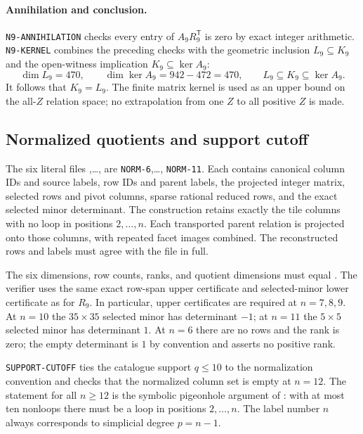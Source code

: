 \documentclass[11pt]{article}
\newcommand{\1}{\mathbf 1}
\begin{document}
\paragraph{Annihilation and conclusion.}
\texttt{N9-ANNIHILATION} checks every entry of $A_9R_9^{\mathsf T}$ is
zero by exact integer arithmetic.  \texttt{N9-KERNEL} combines the
preceding checks with the geometric inclusion $L_9\subseteq K_9$ and
the open-witness implication $K_9\subseteq\ker A_9$:
\[
\dim L_9=470,\qquad \dim\ker A_9=942-472=470,
\qquad L_9\subseteq K_9\subseteq\ker A_9.
\]
It follows that $K_9=L_9$.  The finite matrix kernel is used as an upper
bound on the all-$Z$ relation space; no extrapolation from one $Z$ to all
positive $Z$ is made.

\subsection{Normalized quotients and support cutoff}
\label{cert:NORM-6}\label{cert:NORM-7}\label{cert:NORM-8}
\label{cert:NORM-9}\label{cert:NORM-10}\label{cert:NORM-11}
\label{cert:SUPPORT-CUTOFF}

The six literal files
,\dots,
 are \texttt{NORM-6},\dots,
\texttt{NORM-11}.  Each contains canonical column IDs and source labels,
row IDs and parent labels, the projected integer matrix, selected rows and
pivot columns, sparse rational reduced rows, and the exact selected
minor determinant.  The construction retains exactly the tile columns
with no loop in positions $2,\dots,n$.  Each transported parent relation
is projected onto those columns, with repeated facet images combined.
The reconstructed rows and labels must agree with the file in full.

The six dimensions, row counts, ranks, and quotient dimensions must equal
.  The verifier uses the same exact row-span
upper certificate and selected-minor lower certificate as for $R_9$.
In particular, upper certificates are required at $n=7,8,9$.
At $n=10$ the $35\times35$ selected minor has determinant $-1$;
at $n=11$ the $5\times5$ selected minor has determinant $1$.
At $n=6$ there are no rows and the rank is zero; the empty determinant is
$1$ by convention and asserts no positive rank.

\texttt{SUPPORT-CUTOFF} ties the catalogue support $q\le10$ to the
normalization convention and checks that the normalized column set is
empty at $n=12$.  The statement for all $n\ge12$ is the symbolic
pigeonhole argument of : with at most ten
nonloops there must be a loop in positions $2,\dots,n$.
The label number $n$ always corresponds to simplicial degree $p=n-1$.
\end{document}
